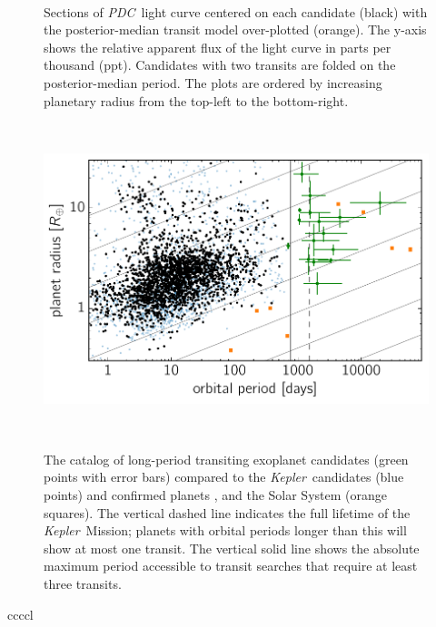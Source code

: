 \documentclass[manuscript, letterpaper]{aastex6}
\newcommand{\project}[1]{\textsl{#1}}
\newcommand{\kepler}{\project{Kepler}}
\newcommand{\pdc}{\project{PDC}}
\newcommand{\dfmfiglabel}[1]{\label{fig:#1}}
\begin{document}
\begin{figure}[p]~\\
\begin{center}

\end{center}
\caption{%
Sections of \pdc\ light curve centered on each candidate (black) with the
posterior-median transit model over-plotted (orange).
The y-axis shows the relative apparent flux of the light curve in parts per
thousand (ppt).
Candidates with two transits are folded on the posterior-median period.
The plots are ordered by increasing planetary radius from the top-left to the
bottom-right.
\dfmfiglabel{light-curves}}
\end{figure}

\begin{figure}~\\
\begin{center}
\includegraphics{figures/full_sample_plus_cands.pdf}
\end{center}
\caption{%
The catalog of long-period transiting exoplanet candidates (green points with
error bars) compared to the \kepler\ candidates (blue points) and confirmed
planets \citep[black points;][]{Morton:2016}, and the Solar System (orange
squares).
The vertical dashed line indicates the full lifetime of the \kepler\ Mission;
planets with orbital periods longer than this will show at most one transit.
The vertical solid line shows the absolute maximum period accessible to
transit searches that require at least three transits.
\dfmfiglabel{full-sample}}~\\
\end{figure}

\begin{floattable}
\begin{deluxetable}{ccccl}
\tabletypesize{\footnotesize}
\caption{The signals rejected with a centroid shift or large impact parameter
\label{tab:rejects}}

\end{deluxetable}
\end{floattable}
\end{document}
